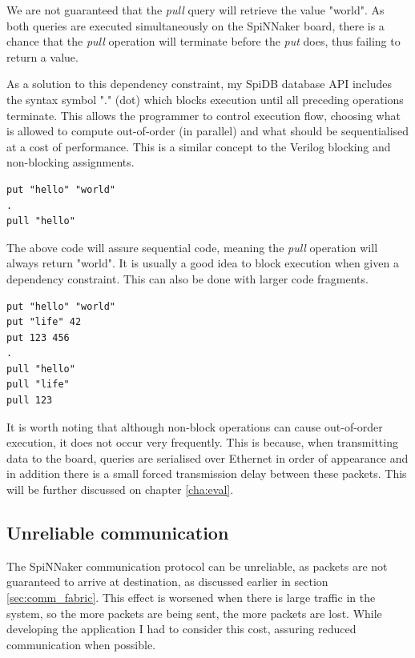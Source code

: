 We are not guaranteed that the \textit{pull} query will retrieve the value "world". As both queries are executed simultaneously on the SpiNNaker board, there is a chance that the \textit{pull} operation will terminate before the \textit{put} does, thus failing to return a value.

As a solution to this dependency constraint, my SpiDB database API includes the syntax symbol "." (dot) which blocks execution until all preceding operations terminate. This allows the programmer to control execution flow, choosing what is allowed to compute out-of-order (in parallel) and what should be sequentialised at a cost of performance. This is a similar concept to the Verilog blocking and non-blocking assignments.

\begin{lstlisting}[caption={Blocking execution}, label=list:blocking1]
put "hello" "world"
.
pull "hello"
\end{lstlisting}

The above code will assure sequential code, meaning the \textit{pull} operation will always return "world". It is usually a good idea to block execution when given a dependency constraint. This can also be done with larger code fragments.

\begin{lstlisting}[caption={Blocking execution}, label=list:blocking2]
put "hello" "world"
put "life" 42
put 123 456
.
pull "hello"
pull "life"
pull 123
\end{lstlisting}

It is worth noting that although non-block operations can cause out-of-order execution, it does not occur very frequently. This is because, when transmitting data to the board, queries are serialised over Ethernet in order of appearance and in addition there is a small forced transmission delay between these packets. This will be further discussed on chapter \ref{cha:eval}.

\subsection{Unreliable communication}
\label{sec:unreliable_comm}

The SpiNNaker communication protocol can be unreliable, as packets are not guaranteed to arrive at destination, as discussed earlier in section \ref{sec:comm_fabric}. This effect is worsened when there is large traffic in the system, so the more packets are being sent, the more packets are lost. While developing the application I had to consider this cost, assuring reduced communication when possible. 

